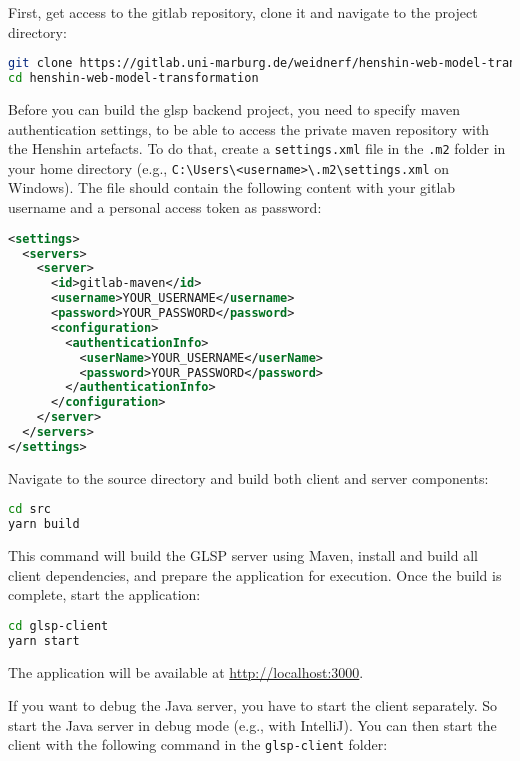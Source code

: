 First, get access to the gitlab repository, clone it and navigate to the project directory:

\begin{lstlisting}[language=bash]
git clone https://gitlab.uni-marburg.de/weidnerf/henshin-web-model-transformation.git
cd henshin-web-model-transformation
\end{lstlisting}

Before you can build the \ac{glsp} backend project, you need to specify maven authentication settings, to be able to access the private maven repository with the Henshin artefacts. To do that, create a \texttt{settings.xml} file in the \texttt{.m2} folder in your home directory (e.g., \texttt{C:\textbackslash Users\textbackslash <username>\textbackslash .m2\textbackslash settings.xml} on Windows). The file should contain the following content with your gitlab username and a personal access token as password:

\begin{lstlisting}[language=xml, caption=Maven Settings]
    <settings>
  <servers>
    <server>
      <id>gitlab-maven</id>
      <username>YOUR_USERNAME</username>
      <password>YOUR_PASSWORD</password>
      <configuration>
        <authenticationInfo>
          <userName>YOUR_USERNAME</userName>
          <password>YOUR_PASSWORD</password>
        </authenticationInfo>
      </configuration>
    </server>
  </servers>
</settings>
\end{lstlisting}


Navigate to the source directory and build both client and server components:

\begin{lstlisting}[language=bash]
cd src
yarn build
\end{lstlisting}

This command will build the GLSP server using Maven, install and build all client dependencies, and prepare the application for execution. Once the build is complete, start the application:

\begin{lstlisting}[language=bash]
cd glsp-client
yarn start
\end{lstlisting}

The application will be available at \url{http://localhost:3000}. 


If you want to debug the Java server, you have to start the client separately. So start the Java server in debug mode (e.g., with IntelliJ). You can then start the client with the following command in the \texttt{glsp-client} folder:

